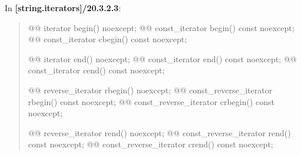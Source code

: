 \documentclass{wg21}
\begin{document}
In \textbf{[string.iterators]/20.3.2.3}:
\begin{quote}
\begin{itemdecl}
@@ iterator       begin() noexcept;
@@ const_iterator begin() const noexcept;
@@ const_iterator cbegin() const noexcept;
\end{itemdecl}

\begin{itemdecl}
@@ iterator       end() noexcept;
@@ const_iterator end() const noexcept;
@@ const_iterator cend() const noexcept;
\end{itemdecl}

\begin{itemdecl}
@@ reverse_iterator       rbegin() noexcept;
@@ const_reverse_iterator rbegin() const noexcept;
@@ const_reverse_iterator crbegin() const noexcept;
\end{itemdecl}

\begin{itemdecl}
@@ reverse_iterator       rend() noexcept;
@@ const_reverse_iterator rend() const noexcept;
@@ const_reverse_iterator crend() const noexcept;
\end{itemdecl}
\end{quote}
\end{document}
